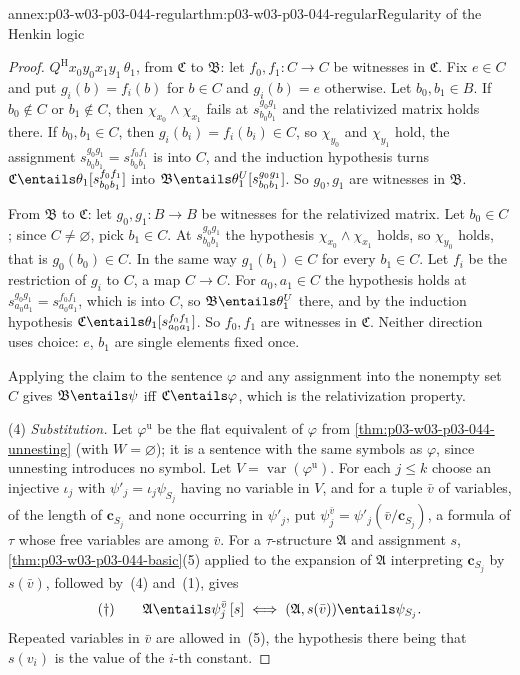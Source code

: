 \begin{annexitem}{annex:p03-w03-p03-044-regular}{thm:p03-w03-p03-044-regular}{Regularity of the Henkin logic}
\begin{proof}
\(Q^{\mathrm H}x_0y_0x_1y_1\,\theta_1\), from \(\mathfrak C\) to
\(\mathfrak B\): let \(f_0,f_1:C\to C\) be witnesses in \(\mathfrak C\).
Fix \(e\in C\) and put \(g_i(b)=f_i(b)\) for \(b\in C\) and \(g_i(b)=e\)
otherwise.  Let \(b_0,b_1\in B\).  If \(b_0\notin C\) or \(b_1\notin C\),
then \(\chi_{x_0}\land\chi_{x_1}\) fails at \(s^{g_0g_1}_{b_0b_1}\) and the
relativized matrix holds there.  If \(b_0,b_1\in C\), then
\(g_i(b_i)=f_i(b_i)\in C\), so \(\chi_{y_0}\) and \(\chi_{y_1}\) hold, the
assignment \(s^{g_0g_1}_{b_0b_1}=s^{f_0f_1}_{b_0b_1}\) is into \(C\), and the
induction hypothesis turns \(\mathfrak C\entails\theta_1[s^{f_0f_1}_{b_0b_1}]\)
into \(\mathfrak B\entails\theta_1^U[s^{g_0g_1}_{b_0b_1}]\).  So
\(g_0,g_1\) are witnesses in \(\mathfrak B\).

From \(\mathfrak B\) to \(\mathfrak C\): let \(g_0,g_1:B\to B\) be witnesses
for the relativized matrix.  Let \(b_0\in C\); since \(C\neq\varnothing\),
pick \(b_1\in C\).  At \(s^{g_0g_1}_{b_0b_1}\) the hypothesis
\(\chi_{x_0}\land\chi_{x_1}\) holds, so \(\chi_{y_0}\) holds, that is
\(g_0(b_0)\in C\).  In the same way \(g_1(b_1)\in C\) for every \(b_1\in
C\).  Let \(f_i\) be the restriction of \(g_i\) to \(C\), a map \(C\to C\).
For \(a_0,a_1\in C\) the hypothesis holds at
\(s^{g_0g_1}_{a_0a_1}=s^{f_0f_1}_{a_0a_1}\), which is into \(C\), so
\(\mathfrak B\entails\theta_1^U\) there, and by the induction hypothesis
\(\mathfrak C\entails\theta_1[s^{f_0f_1}_{a_0a_1}]\).  So \(f_0,f_1\) are
witnesses in \(\mathfrak C\).  Neither direction uses choice: \(e\),
\(b_1\) are single elements fixed once.

Applying the claim to the sentence \(\varphi\) and any assignment into the
nonempty set \(C\) gives \(\mathfrak B\entails\psi\) iff
\(\mathfrak C\entails\varphi\), which is the relativization property.

(4) \emph{Substitution.}  Let \(\varphi^{\mathrm u}\) be the flat
equivalent of \(\varphi\) from \cref{thm:p03-w03-p03-044-unnesting} (with
\(W=\varnothing\)); it is a sentence with the same symbols as \(\varphi\),
since unnesting introduces no symbol.  Let \(V=\operatorname{var}
(\varphi^{\mathrm u})\).  For each \(j\le k\) choose an injective
\(\iota_j\) with \(\psi'_j=\iota_j\psi_{S_j}\) having no variable in \(V\),
and for a tuple \(\bar v\) of variables, of the length of \(\mathbf
c_{S_j}\) and none occurring in \(\psi'_j\), put
\(\psi_j^{\bar v}=\psi'_j(\bar v/\mathbf c_{S_j})\), a formula of \(\tau\)
whose free variables are among \(\bar v\).  For a \(\tau\)-structure
\(\mathfrak A\) and assignment \(s\), \cref{thm:p03-w03-p03-044-basic}(5)
applied to the expansion of \(\mathfrak A\) interpreting \(\mathbf c_{S_j}\)
by \(s(\bar v)\), followed by~(4) and~(1), gives
\[
 (\dagger)\qquad
 \mathfrak A\entails\psi_j^{\bar v}\,[s]\iff
 (\mathfrak A,s(\bar v))\entails\psi_{S_j}.
\]
Repeated variables in \(\bar v\) are allowed in~(5), the hypothesis there
being that \(s(v_i)\) is the value of the \(i\)-th constant.


\end{proof}
\end{annexitem}
